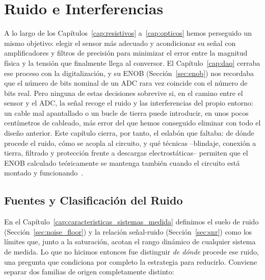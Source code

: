 

\chapter{Ruido e Interferencias}\label{cap:ruido}

A lo largo de los Capítulos~\ref{cap:resistivos} a~\ref{cap:opticos} hemos perseguido un mismo objetivo: elegir el sensor más adecuado y acondicionar su señal con amplificadores y filtros de precisión para minimizar el error entre la magnitud física y la tensión que finalmente llega al conversor. El Capítulo~\ref{cap:daq} cerraba ese proceso con la digitalización, y su ENOB (Sección~\ref{sec:enob}) nos recordaba que el número de bits nominal de un ADC rara vez coincide con el número de bits real. Pero ninguna de estas decisiones sobrevive si, en el camino entre el sensor y el ADC, la señal recoge el ruido y las interferencias del propio entorno: un cable mal apantallado o un bucle de tierra puede introducir, en unos pocos centímetros de cableado, más error del que hemos conseguido eliminar con todo el diseño anterior. Este capítulo cierra, por tanto, el eslabón que faltaba: de dónde procede el ruido, cómo se acopla al circuito, y qué técnicas --blindaje, conexión a tierra, filtrado y protección frente a descargas electrostáticas-- permiten que el ENOB calculado teóricamente se mantenga también cuando el circuito está montado y funcionando~\cite{ott1988noise}.

\section{Fuentes y Clasificación del Ruido}\label{sec:fuentes_ruido}

En el Capítulo~\ref{cap:caracteristicas_sistemas_medida} definimos el suelo de ruido (Sección~\ref{sec:noise_floor}) y la relación señal-ruido (Sección~\ref{sec:snr}) como los límites que, junto a la saturación, acotan el rango dinámico de cualquier sistema de medida. Lo que no hicimos entonces fue distinguir \emph{de dónde} procede ese ruido, una pregunta que condiciona por completo la estrategia para reducirlo. Conviene separar dos familias de origen completamente distinto:

